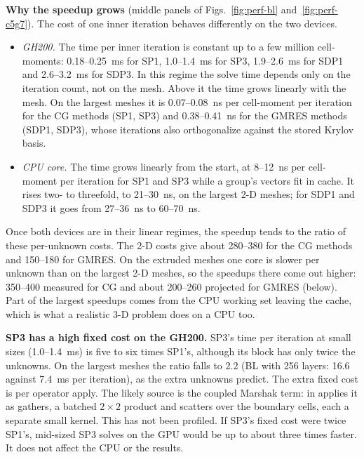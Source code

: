 \textbf{Why the speedup grows} (middle panels of Figs.~\ref{fig:perf-bl}
and~\ref{fig:perf-c5g7}). The cost of one inner iteration behaves differently
on the two devices.
\begin{itemize}
\item \emph{GH200.} The time per inner iteration is constant up to a few
  million cell-moments: 0.18--0.25~ms for SP1, 1.0--1.4~ms for SP3,
  1.9--2.6~ms for SDP1 and 2.6--3.2~ms for SDP3. In this regime the solve
  time depends only on the iteration count, not on the mesh. Above it the
  time grows linearly with the mesh. On the largest meshes it is
  0.07--0.08~ns per cell-moment per iteration for the CG methods (SP1, SP3)
  and 0.38--0.41~ns for the GMRES methods (SDP1, SDP3), whose iterations
  also orthogonalize against the stored Krylov basis.
\item \emph{CPU core.} The time grows linearly from the start, at 8--12~ns per
  cell-moment per iteration for SP1 and SP3 while a group's vectors fit in
  cache. It rises two- to threefold, to 21--30~ns, on the largest 2-D
  meshes; for SDP1 and SDP3 it goes from 27--36~ns to 60--70~ns.
\end{itemize}
Once both devices are in their linear regimes, the speedup tends to the ratio
of these per-unknown costs. The 2-D costs give about 280--380 for the CG
methods and 150--180 for GMRES. On the extruded meshes one core is slower per
unknown than on the largest 2-D meshes, so the speedups there come out
higher: 350--400 measured for CG and about 200--260 projected for GMRES
(below). Part of the largest speedups comes from the CPU working set leaving
the cache, which is what a realistic 3-D problem does on a CPU too.

\textbf{SP3 has a high fixed cost on the GH200.} SP3's time per iteration at
small sizes (1.0--1.4~ms) is five to six times SP1's, although its block has
only twice the unknowns. On the largest meshes the ratio falls to 2.2 (BL
with 256 layers: 16.6 against 7.4~ms per iteration), as the extra unknowns
predict. The extra fixed cost is per operator apply. The likely source is the
coupled Marshak term:  in  applies
it as gathers, a batched $2 \times 2$ product and scatters over the boundary
cells, each a separate small kernel. This has not been profiled. If SP3's
fixed cost were twice SP1's, mid-sized SP3 solves on the GPU would be up to
about three times faster. It does not affect the CPU or the results.

